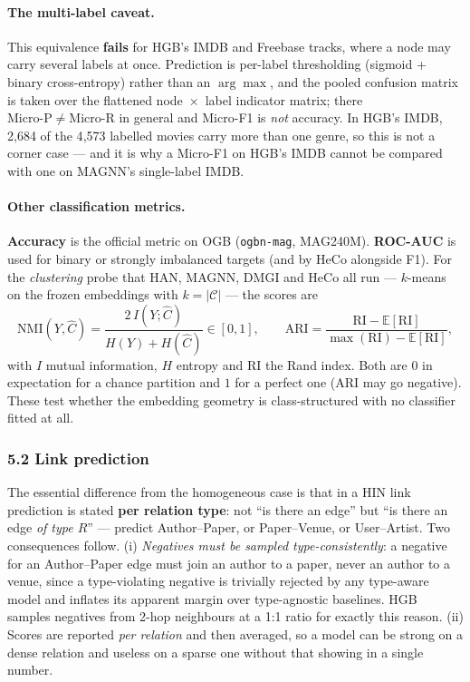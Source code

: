 \paragraph{The multi-label caveat.} This equivalence \textbf{fails} for HGB's IMDB and Freebase
tracks, where a node may carry several labels at once. Prediction is per-label thresholding (sigmoid
+ binary cross-entropy) rather than an $\arg\max$, and the pooled confusion matrix is taken over the
flattened node~$\times$~label indicator matrix; there $\mathrm{Micro\text{-}P}\neq
\mathrm{Micro\text{-}R}$ in general and Micro-F1 is \emph{not} accuracy. In HGB's IMDB, 2{,}684 of
the 4{,}573 labelled movies carry more than one genre, so this is not a corner case --- and it is
why a Micro-F1 on HGB's IMDB cannot be compared with one on MAGNN's single-label IMDB.

\paragraph{Other classification metrics.} \textbf{Accuracy} is the official metric on OGB
(\texttt{ogbn-mag}, MAG240M). \textbf{ROC-AUC} is used for binary or strongly imbalanced targets
(and by HeCo alongside F1). For the \emph{clustering} probe that HAN, MAGNN, DMGI and HeCo all run
--- $k$-means on the frozen embeddings with $k=|\mathcal{C}|$ --- the scores are
\[
  \mathrm{NMI}(Y,\hat{C})=\frac{2\,I(Y;\hat{C})}{H(Y)+H(\hat{C})}\in[0,1],
  \qquad
  \mathrm{ARI}=\frac{\mathrm{RI}-\mathbb{E}[\mathrm{RI}]}
                    {\max(\mathrm{RI})-\mathbb{E}[\mathrm{RI}]},
\]
with $I$ mutual information, $H$ entropy and $\mathrm{RI}$ the Rand index. Both are $0$ in
expectation for a chance partition and $1$ for a perfect one (ARI may go negative). These test
whether the embedding geometry is class-structured with no classifier fitted at all.

\subsubsection*{5.2 Link prediction}

The essential difference from the homogeneous case is that in a HIN link prediction is stated
\textbf{per relation type}: not ``is there an edge'' but ``is there an edge \emph{of type $R$}''
--- predict Author--Paper, or Paper--Venue, or User--Artist. Two consequences follow.
(i) \emph{Negatives must be sampled type-consistently}: a negative for an Author--Paper edge must
join an author to a paper, never an author to a venue, since a type-violating negative is trivially
rejected by any type-aware model and inflates its apparent margin over type-agnostic baselines.
HGB samples negatives from 2-hop neighbours at a 1:1 ratio for exactly this reason.
(ii) Scores are reported \emph{per relation} and then averaged, so a model can be strong on a dense
relation and useless on a sparse one without that showing in a single number.

